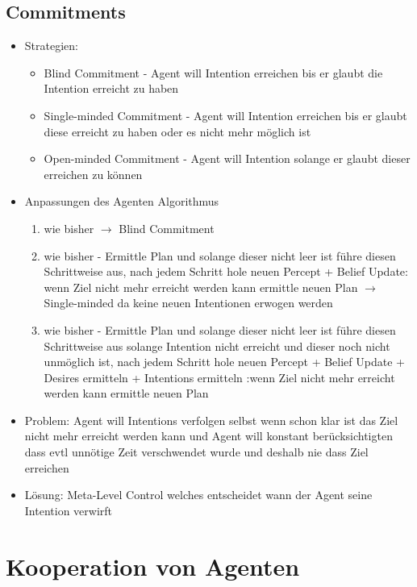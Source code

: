 \documentclass{article} %
\begin{document}
	\subsection{Commitments}
	\begin{itemize}
		\item Strategien:
		\begin{itemize}
			\item Blind Commitment - Agent will Intention erreichen bis er glaubt die Intention erreicht zu haben
			\item Single-minded Commitment - Agent will Intention erreichen bis er glaubt diese erreicht zu haben oder es nicht mehr möglich ist
			\item Open-minded Commitment - Agent will Intention solange er glaubt dieser erreichen zu können
		\end{itemize}
		\item Anpassungen des Agenten Algorithmus
		\begin{enumerate}
			\item wie bisher $\rightarrow$ Blind Commitment
			\item wie bisher - Ermittle Plan und solange dieser nicht leer ist führe diesen Schrittweise aus, nach jedem Schritt hole neuen Percept + Belief Update: wenn Ziel nicht mehr erreicht werden kann ermittle neuen Plan $\rightarrow$ Single-minded da keine neuen Intentionen erwogen werden
			\item wie bisher - Ermittle Plan und solange dieser nicht leer ist führe diesen Schrittweise aus solange Intention nicht erreicht und dieser noch nicht unmöglich ist, nach jedem Schritt hole neuen Percept + Belief Update + Desires ermitteln + Intentions ermitteln :wenn Ziel nicht mehr erreicht werden kann ermittle neuen Plan
		\end{enumerate}
		\item Problem: Agent will Intentions verfolgen selbst wenn schon klar ist das Ziel nicht mehr erreicht werden kann und Agent will konstant berücksichtigten dass evtl unnötige Zeit verschwendet wurde und deshalb nie dass Ziel erreichen
		\item Lösung: Meta-Level Control welches entscheidet wann der Agent seine Intention verwirft
	\end{itemize}
\section{Kooperation von Agenten}
\end{document}
